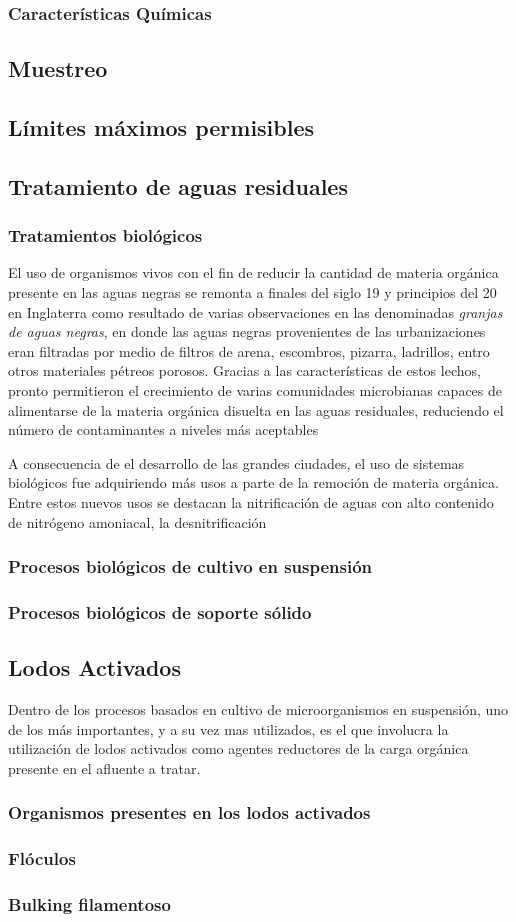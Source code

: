 \subsubsection{Características Químicas}
\subsection{Muestreo}
\subsection{Límites máximos permisibles}
\subsection{Tratamiento de aguas residuales}

\subsubsection{Tratamientos biológicos}
El uso de organismos vivos con el fin de reducir la cantidad de materia orgánica presente en las aguas negras se remonta a finales del siglo 19 y principios del 20 en Inglaterra como resultado de varias observaciones en las denominadas \emph{granjas de aguas negras}, en donde las aguas negras provenientes de las urbanizaciones eran filtradas por medio de filtros de arena, escombros, pizarra, ladrillos, entro otros materiales pétreos porosos. Gracias a las características de estos lechos, pronto permitieron el crecimiento de varias comunidades microbianas capaces de alimentarse de la materia orgánica disuelta en las aguas residuales, reduciendo el número de contaminantes a niveles más aceptables~\citep{Fair2008}\par
A consecuencia de el desarrollo de las grandes ciudades, el uso de sistemas biológicos fue adquiriendo más usos a parte de la remoción de materia orgánica. Entre estos nuevos usos se destacan la nitrificación de aguas con alto contenido de nitrógeno amoniacal, la desnitrificación 
\subsubsection*{Procesos biológicos de cultivo en suspensión}
\subsubsection*{Procesos biológicos de soporte sólido}
\subsection{Lodos Activados}
Dentro de los procesos basados en cultivo de microorganismos en suspensión, uno de los más importantes, y a su vez mas utilizados, es el que involucra la utilización de lodos activados como agentes reductores de la carga orgánica presente en el afluente a tratar.
\subsubsection{Organismos presentes en los lodos activados}
\subsubsection{Flóculos}
\subsubsection{Bulking filamentoso}
